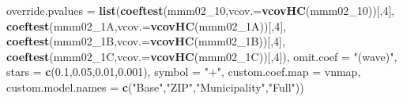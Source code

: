 \documentclass[
]{article}
\newenvironment{Shaded}{\begin{snugshade}}{\end{snugshade}}
\newcommand{\DataTypeTok}[1]{\textcolor[rgb]{0.13,0.29,0.53}{#1}}
\newcommand{\DecValTok}[1]{\textcolor[rgb]{0.00,0.00,0.81}{#1}}
\newcommand{\FloatTok}[1]{\textcolor[rgb]{0.00,0.00,0.81}{#1}}
\newcommand{\KeywordTok}[1]{\textcolor[rgb]{0.13,0.29,0.53}{\textbf{#1}}}
\newcommand{\NormalTok}[1]{#1}
\newcommand{\StringTok}[1]{\textcolor[rgb]{0.31,0.60,0.02}{#1}}
\begin{document}
\begin{Shaded}
\begin{Highlighting}[]
          \DataTypeTok{override.pvalues =} \KeywordTok{list}\NormalTok{(}\KeywordTok{coeftest}\NormalTok{(mmm02_}\DecValTok{10}\NormalTok{,}\DataTypeTok{vcov.=}\KeywordTok{vcovHC}\NormalTok{(mmm02_}\DecValTok{10}\NormalTok{))[,}\DecValTok{4}\NormalTok{],}
                                  \KeywordTok{coeftest}\NormalTok{(mmm02_1A,}\DataTypeTok{vcov.=}\KeywordTok{vcovHC}\NormalTok{(mmm02_1A))[,}\DecValTok{4}\NormalTok{],}
                                  \KeywordTok{coeftest}\NormalTok{(mmm02_1B,}\DataTypeTok{vcov.=}\KeywordTok{vcovHC}\NormalTok{(mmm02_1B))[,}\DecValTok{4}\NormalTok{],}
                                  \KeywordTok{coeftest}\NormalTok{(mmm02_1C,}\DataTypeTok{vcov.=}\KeywordTok{vcovHC}\NormalTok{(mmm02_1C))[,}\DecValTok{4}\NormalTok{]),}
          \DataTypeTok{omit.coef =} \StringTok{"(wave)"}\NormalTok{, }\DataTypeTok{stars =} \KeywordTok{c}\NormalTok{(}\FloatTok{0.1}\NormalTok{,}\FloatTok{0.05}\NormalTok{,}\FloatTok{0.01}\NormalTok{,}\FloatTok{0.001}\NormalTok{), }\DataTypeTok{symbol =} \StringTok{"+"}\NormalTok{,}
          \DataTypeTok{custom.coef.map =}\NormalTok{ vnmap, }
          \DataTypeTok{custom.model.names =} \KeywordTok{c}\NormalTok{(}\StringTok{"Base"}\NormalTok{,}\StringTok{"ZIP"}\NormalTok{,}\StringTok{"Municipality"}\NormalTok{,}\StringTok{"Full"}\NormalTok{))}
\end{Highlighting}
\end{Shaded}
\end{document}
